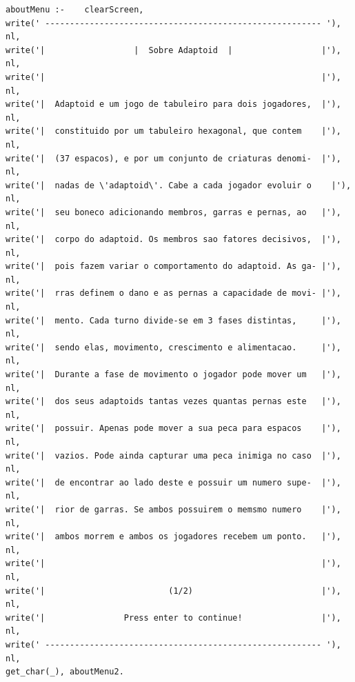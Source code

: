 \documentclass[a4paper]{article}
\begin{document}
\begin{lstlisting}
aboutMenu :-    clearScreen,
write(' -------------------------------------------------------- '), nl,
write('|                  |  Sobre Adaptoid  |                  |'), nl,
write('|                                                        |'), nl,
write('|  Adaptoid e um jogo de tabuleiro para dois jogadores,  |'), nl,
write('|  constituido por um tabuleiro hexagonal, que contem    |'), nl,
write('|  (37 espacos), e por um conjunto de criaturas denomi-  |'), nl,
write('|  nadas de \'adaptoid\'. Cabe a cada jogador evoluir o    |'), nl,
write('|  seu boneco adicionando membros, garras e pernas, ao   |'), nl,
write('|  corpo do adaptoid. Os membros sao fatores decisivos,  |'), nl,
write('|  pois fazem variar o comportamento do adaptoid. As ga- |'), nl,
write('|  rras definem o dano e as pernas a capacidade de movi- |'), nl,
write('|  mento. Cada turno divide-se em 3 fases distintas,     |'), nl,
write('|  sendo elas, movimento, crescimento e alimentacao.     |'), nl,
write('|  Durante a fase de movimento o jogador pode mover um   |'), nl,
write('|  dos seus adaptoids tantas vezes quantas pernas este   |'), nl,
write('|  possuir. Apenas pode mover a sua peca para espacos    |'), nl,
write('|  vazios. Pode ainda capturar uma peca inimiga no caso  |'), nl,
write('|  de encontrar ao lado deste e possuir um numero supe-  |'), nl,
write('|  rior de garras. Se ambos possuirem o memsmo numero    |'), nl,
write('|  ambos morrem e ambos os jogadores recebem um ponto.   |'), nl,
write('|                                                        |'), nl,
write('|                         (1/2)                          |'), nl,
write('|                Press enter to continue!                |'), nl,
write(' -------------------------------------------------------- '), nl,
get_char(_), aboutMenu2.


\end{lstlisting}
\end{document}
